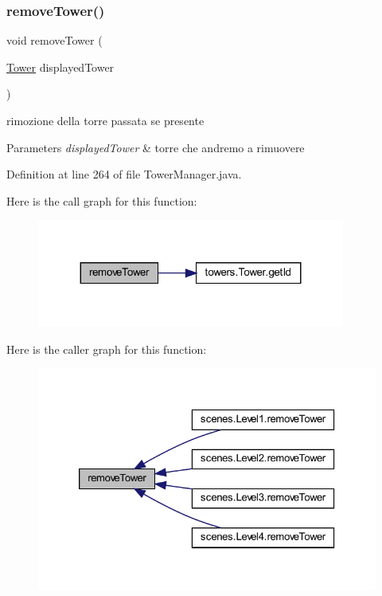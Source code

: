 \subsubsection{\texorpdfstring{remove\+Tower()}{removeTower()}}
{\footnotesize\ttfamily void remove\+Tower (\begin{DoxyParamCaption}\item[{\hyperlink{classtowers_1_1_tower}{Tower}}]{displayed\+Tower }\end{DoxyParamCaption})}



rimozione della torre passata se presente 


\begin{DoxyParams}{Parameters}
{\em displayed\+Tower} & torre che andremo a rimuovere \\
\hline
\end{DoxyParams}


Definition at line 264 of file Tower\+Manager.\+java.

Here is the call graph for this function\+:\nopagebreak
\begin{figure}[H]
\begin{center}
\leavevmode
\includegraphics[width=287pt]{classmanagers_1_1_tower_manager_addba85b44e35a186e066b2e801f433c4_cgraph}
\end{center}
\end{figure}
Here is the caller graph for this function\+:\nopagebreak
\begin{figure}[H]
\begin{center}
\leavevmode
\includegraphics[width=326pt]{classmanagers_1_1_tower_manager_addba85b44e35a186e066b2e801f433c4_icgraph}
\end{center}
\end{figure}
\mbox{\label{classmanagers_1_1_tower_manager_a8a3c715fcfd3d65e1d8241a1fa4965ff}} 
